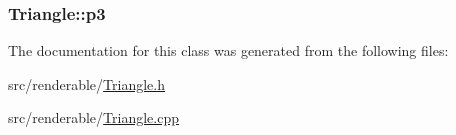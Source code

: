 \subsubsection[{\texorpdfstring{p3}{p3}}]{ Triangle\+::p3\hspace{0.3cm}{\ttfamily [private]}}\hypertarget{classTriangle_a600c7366c1dad8996026742eb12434c6}{}\label{classTriangle_a600c7366c1dad8996026742eb12434c6}


The documentation for this class was generated from the following files\+:\begin{DoxyCompactItemize}
\item 
src/renderable/\hyperlink{Triangle_8h}{Triangle.\+h}\item 
src/renderable/\hyperlink{Triangle_8cpp}{Triangle.\+cpp}\end{DoxyCompactItemize}
